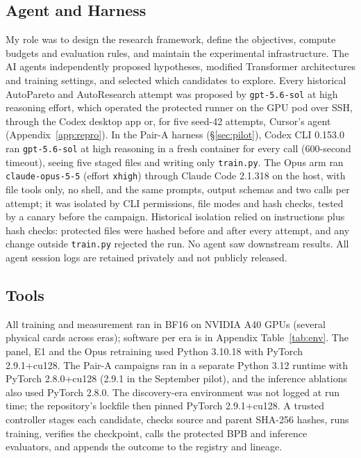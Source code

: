 \documentclass{article}
\begin{document}
\subsection{Agent and Harness}\label{sec:agent}
My role was to design the research framework, define the objectives, compute budgets and evaluation rules, and maintain the experimental infrastructure. The AI agents independently proposed hypotheses, modified Transformer architectures and training settings, and selected which candidates to explore. Every historical AutoPareto and AutoResearch attempt was proposed by \texttt{gpt-5.6-sol} at high reasoning effort, which operated the protected runner on the GPU pod over SSH, through the Codex desktop app or, for five seed-42 attempts, Cursor's agent (Appendix~\ref{app:repro}). In the Pair-A harness (\S\ref{sec:pilot}), Codex CLI 0.153.0 ran \texttt{gpt-5.6-sol} at high reasoning in a fresh container for every call (600-second timeout), seeing five staged files and writing only \texttt{train.py}. The Opus arm ran \texttt{claude-opus-5-5} (effort \texttt{xhigh}) through Claude Code 2.1.318 on the host, with file tools only, no shell, and the same prompts, output schemas and two calls per attempt; it was isolated by CLI permissions, file modes and hash checks, tested by a canary before the campaign. Historical isolation relied on instructions plus hash checks: protected files were hashed before and after every attempt, and any change outside \texttt{train.py} rejected the run. No agent saw downstream results. All agent session logs are retained privately and not publicly released.

\subsection{Tools}
All training and measurement ran in BF16 on NVIDIA A40 GPUs (several physical cards across eras); software per era is in Appendix Table~\ref{tab:env}. The panel, E1 and the Opus retraining used Python 3.10.18 with PyTorch 2.9.1+cu128. The Pair-A campaigns ran in a separate Python 3.12 runtime with PyTorch 2.8.0+cu128 (2.9.1 in the September pilot), and the inference ablations also used PyTorch 2.8.0. The discovery-era environment was not logged at run time; the repository's lockfile then pinned PyTorch 2.9.1+cu128. A trusted controller stages each candidate, checks source and parent SHA-256 hashes, runs training, verifies the checkpoint, calls the protected BPB and inference evaluators, and appends the outcome to the registry and lineage.
\end{document}
